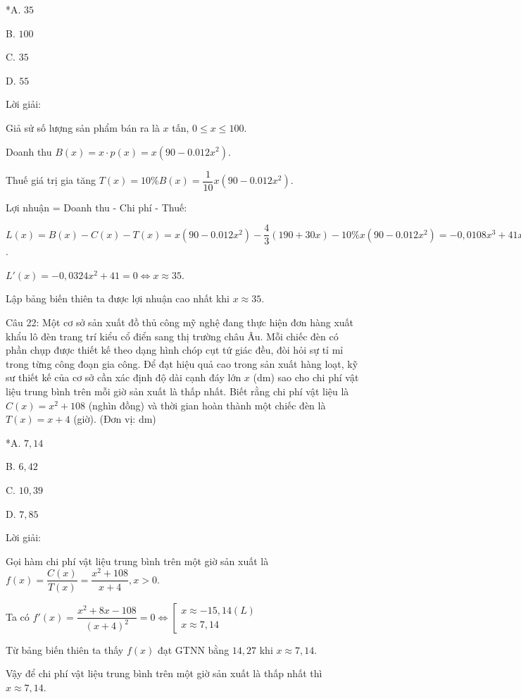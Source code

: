 \documentclass[a4paper,12pt]{article}
\begin{document}
*A. \(35\)

B. \(100\)

C. \(35\)

D. \(55\)

Lời giải:


Giả sử số lượng sản phẩm bán ra là \(x\) tấn, \(0 \leq x \leq 100\).

Doanh thu \(B(x) = x \cdot p(x) = x(90 - 0.012x^2)\).

Thuế giá trị gia tăng \(T(x) = 10\% B(x) = \dfrac{1}{10} x(90 - 0.012x^2)\).

Lợi nhuận = Doanh thu - Chi phí - Thuế:

\(L(x) = B(x) - C(x) - T(x) = x(90 - 0.012x^2) - \dfrac{4}{3}(190 + 30x) - 10\% x(90 - 0.012x^2) = -0,0108x^3 + 41x + -253,33\).

\(L'(x) = -0,0324x^2 + 41 = 0 \Leftrightarrow x \approx 35\).

Lập bảng biến thiên ta được lợi nhuận cao nhất khi \(x \approx 35\).




Câu 22: Một cơ sở sản xuất đồ thủ công mỹ nghệ đang thực hiện đơn hàng xuất khẩu lô đèn trang trí kiểu cổ điển sang thị trường châu Âu. Mỗi chiếc đèn có phần chụp được thiết kế theo dạng hình chóp cụt tứ giác đều, đòi hỏi sự tỉ mỉ trong từng công đoạn gia công. Để đạt hiệu quả cao trong sản xuất hàng loạt, kỹ sư thiết kế của cơ sở cần xác định độ dài cạnh đáy lớn \(x\) (dm) sao cho chi phí vật liệu trung bình trên mỗi giờ sản xuất là thấp nhất. Biết rằng chi phí vật liệu là \(C(x) = x^2 + 108\) (nghìn đồng) và thời gian hoàn thành một chiếc đèn là \(T(x) = x + 4\) (giờ). (Đơn vị: dm)

*A. \(7,14\)

B. \(6,42\)

C. \(10,39\)

D. \(7,85\)

Lời giải:


Gọi hàm chi phí vật liệu trung bình trên một giờ sản xuất là \(f(x)=\dfrac{C(x)}{T(x)}=\dfrac{x^2+108}{x+4}, x>0\).

Ta có \(f'(x)=\dfrac{x^2+8x-108}{(x+4)^2}=0 \Leftrightarrow \left[\begin{array}{l}x \approx -15,14(L) \\ x \approx 7,14\end{array}\right.\)

Từ bảng biến thiên ta thấy \(f(x)\) đạt GTNN bằng \(14,27\) khi \(x \approx 7,14\).

Vậy để chi phí vật liệu trung bình trên một giờ sản xuất là thấp nhất thì \(x \approx 7,14\).
\end{document}
